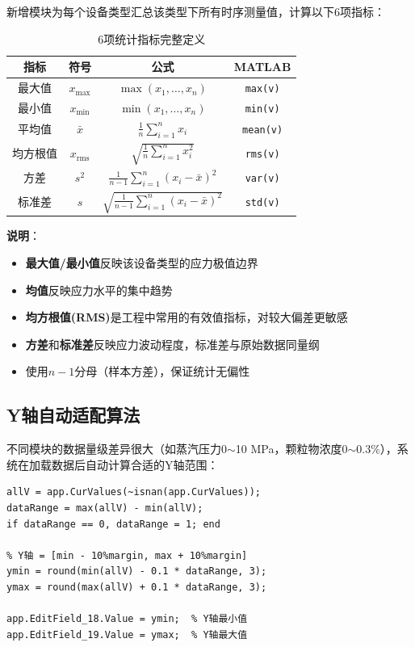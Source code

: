 \documentclass[12pt,a3paper]{ctexart}
\begin{document}
新增模块为每个设备类型汇总该类型下所有时序测量值，计算以下6项指标：

\begin{table}[H]
\centering
\caption{6项统计指标完整定义}
\begin{tabular}{c|c|c|c}
\toprule
\textbf{指标} & \textbf{符号} & \textbf{公式} & \textbf{MATLAB} \\
\midrule
最大值 & $x_{\max}$ & $\max(x_1,\ldots,x_n)$ & \texttt{max(v)} \\
最小值 & $x_{\min}$ & $\min(x_1,\ldots,x_n)$ & \texttt{min(v)} \\
平均值 & $\bar{x}$ & $\frac{1}{n}\sum_{i=1}^{n}x_i$ & \texttt{mean(v)} \\
均方根值 & $x_{\text{rms}}$ & $\sqrt{\frac{1}{n}\sum_{i=1}^{n}x_i^2}$ & \texttt{rms(v)} \\
方差 & $s^2$ & $\frac{1}{n-1}\sum_{i=1}^{n}(x_i-\bar{x})^2$ & \texttt{var(v)} \\
标准差 & $s$ & $\sqrt{\frac{1}{n-1}\sum_{i=1}^{n}(x_i-\bar{x})^2}$ & \texttt{std(v)} \\
\bottomrule
\end{tabular}
\end{table}

\textbf{说明}：
\begin{itemize}
    \item \textbf{最大值/最小值}反映该设备类型的应力极值边界
    \item \textbf{均值}反映应力水平的集中趋势
    \item \textbf{均方根值(RMS)}是工程中常用的有效值指标，对较大偏差更敏感
    \item \textbf{方差}和\textbf{标准差}反映应力波动程度，标准差与原始数据同量纲
    \item 使用$n-1$分母（样本方差），保证统计无偏性
\end{itemize}

\subsection{Y轴自动适配算法}

不同模块的数据量级差异很大（如蒸汽压力0$\sim$10 MPa，颗粒物浓度0$\sim$0.3\%），系统在加载数据后自动计算合适的Y轴范围：

\begin{lstlisting}[caption={Y轴自动范围计算}]
% 计算数据范围
allV = app.CurValues(~isnan(app.CurValues));
dataRange = max(allV) - min(allV);
if dataRange == 0, dataRange = 1; end

% Y轴 = [min - 10%margin, max + 10%margin]
ymin = round(min(allV) - 0.1 * dataRange, 3);
ymax = round(max(allV) + 0.1 * dataRange, 3);

app.EditField_18.Value = ymin;  % Y轴最小值
app.EditField_19.Value = ymax;  % Y轴最大值
\end{lstlisting}
\end{document}
